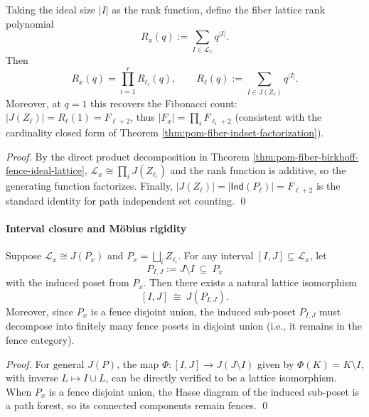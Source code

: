 \begin{corollary}\label{cor:pom-fiber-fence-rank-poly-factorization}
Taking the ideal size \(|I|\) as the rank function, define the fiber lattice rank polynomial
\[
R_x(q):=\sum_{I\in \mathcal L_x} q^{|I|}.
\]
Then
\[
R_x(q)=\prod_{i=1}^r R_{\ell_i}(q),
\qquad
R_\ell(q):=\sum_{I\in J(Z_\ell)} q^{|I|}.
\]
Moreover, at \(q=1\) this recovers the Fibonacci count: \(|J(Z_\ell)|=R_\ell(1)=F_{\ell+2}\), thus
\(
|F_x|=\prod_i F_{\ell_i+2}
\)
(consistent with the cardinality closed form of Theorem \ref{thm:pom-fiber-indset-factorization}).
\end{corollary}
\begin{proof}
By the direct product decomposition in Theorem \ref{thm:pom-fiber-birkhoff-fence-ideal-lattice},
\(\mathcal L_x\cong\prod_i J(Z_{\ell_i})\) and the rank function is additive, so the generating function factorizes.
Finally, \(|J(Z_\ell)|=|\mathsf{Ind}(P_\ell)|=F_{\ell+2}\) is the standard identity for path independent set counting. \qed
\end{proof}

\paragraph{Interval closure and Möbius rigidity}
\begin{theorem}\label{thm:pom-fence-interval-closure}
Suppose \(\mathcal L_x\cong J(P_x)\) and \(P_x=\bigsqcup_i Z_{\ell_i}\).
For any interval \([I,J]\subseteq \mathcal L_x\), let
\[
P_{I,J}:=J\setminus I\ \subseteq\ P_x
\]
with the induced poset from \(P_x\).
Then there exists a natural lattice isomorphism
\[
[I,J]\ \cong\ J(P_{I,J}).
\]
Moreover, since \(P_x\) is a fence disjoint union, the induced sub-poset \(P_{I,J}\) must decompose into finitely many fence posets in disjoint union (i.e., it remains in the fence category).
\end{theorem}
\begin{proof}
For general \(J(P)\), the map \(\Phi:[I,J]\to J(J\setminus I)\) given by \(\Phi(K)=K\setminus I\),
with inverse \(L\mapsto I\cup L\), can be directly verified to be a lattice isomorphism.
When \(P_x\) is a fence disjoint union, the Hasse diagram of the induced sub-poset is a path forest, so its connected components remain fences. \qed
\end{proof}

